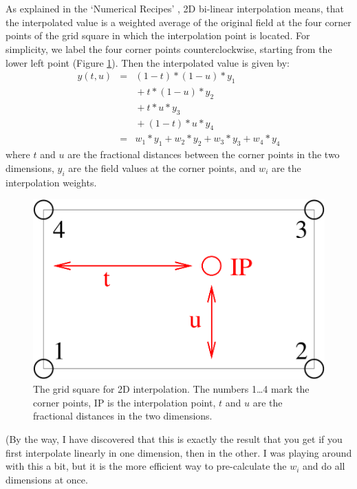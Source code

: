 \section{}

As explained in the `Numerical Recipes'
\citep{numerical_recipes_C:97}, 2D bi-linear interpolation means, that
the interpolated value is a weighted average of the original field at
the four corner points of the grid square in which the interpolation
point is located. For simplicity, we label the four corner points
counterclockwise, starting from the lower left point (Figure
\ref{fig:interpolation:square}).  Then the interpolated value is given
by:
\begin{eqnarray}
  y(t,u)
  &=& (1-t)*(1-u)*y_1 \nonumber \\
  & & \mbox{} + t*(1-u)*y_2 \nonumber \\
  & & \mbox{} + t*u*y_3 \nonumber \\
  & & \mbox{} + (1-t)*u*y_4 \nonumber \\
  &=& w_1*y_1 + w_2*y_2 + w_3*y_3 + w_4*y_4
\label{eq:interpolation:weights}
\end{eqnarray}
where $t$ and $u$ are the fractional distances between the
corner points in the two dimensions, $y_i$ are the field values
at the corner points, and $w_i$ are the interpolation weights.

\begin{figure}
  \centering
  \includegraphics[width=.4\hsize]{interpolation_square}
  \caption{The grid square for 2D interpolation. The numbers 1\ldots 4
    mark the corner points, IP is the interpolation point, $t$ and $u$
    are the fractional distances in the two dimensions.}
  \label{fig:interpolation:square}
\end{figure}

(By the way, I have discovered that this is exactly the result that
you get if you first interpolate linearly in one dimension, then in
the other. I was playing around with this a bit, but it is the more
efficient way to pre-calculate the $w_i$ and do all dimensions at once.

